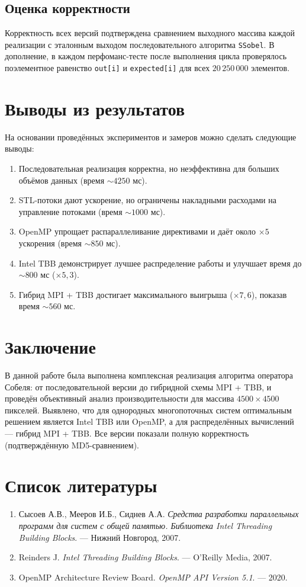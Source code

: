 \documentclass[12pt]{article}
\begin{document}
\subsection{Оценка корректности}

Корректность всех версий подтверждена сравнением выходного массива каждой реализации с эталонным выходом последовательного алгоритма \texttt{SSobel}. В дополнение, в каждом перфоманс-тесте после выполнения цикла проверялось поэлементное равенство \texttt{out[i]} и \texttt{expected[i]} для всех $20\,250\,000$ элементов.

\section{Выводы из результатов}

На основании проведённых экспериментов и замеров можно сделать следующие выводы:
\begin{enumerate}
    \item Последовательная реализация корректна, но неэффективна для больших объёмов данных (время $\sim 4250$ мс).
    \item STL-потоки дают ускорение, но ограничены накладными расходами на управление потоками (время $\sim 1000$ мс).
    \item OpenMP упрощает распараллеливание директивами и даёт около $\times 5$ ускорения (время $\sim 850$ мс).
    \item Intel TBB демонстрирует лучшее распределение работы и улучшает время до $\sim 800$ мс ($\times 5{,}3$).
    \item Гибрид MPI + TBB достигает максимального выигрыша ($\times 7{,}6$), показав время $\sim 560$ мс.
\end{enumerate}

\section{Заключение}

В данной работе была выполнена комплексная реализация алгоритма оператора Собеля: от последовательной версии до гибридной схемы MPI + TBB, и проведён объективный анализ производительности для массива $4500\times4500$ пикселей. Выявлено, что для однородных многопоточных систем оптимальным решением является Intel TBB или OpenMP, а для распределённых вычислений — гибрид MPI + TBB. Все версии показали полную корректность (подтверждённую MD5-сравнением).

\section{Список литературы}
\begin{enumerate}
 \item Сысоев А.В., Мееров И.Б., Сиднев А.А. \textit{Средства разработки параллельных программ для систем с общей памятью. Библиотека Intel Threading Building Blocks}. — Нижний Новгород, 2007.
 \item Reinders J. \textit{Intel Threading Building Blocks}. — O’Reilly Media, 2007.
 \item OpenMP Architecture Review Board. \textit{OpenMP API Version 5.1}. — 2020.
\end{enumerate}
\end{document}
